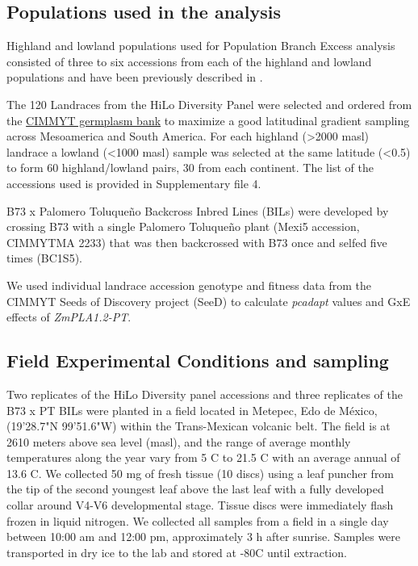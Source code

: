 \documentclass[9pt,twocolumn,twoside,lineno]{BioRxiv}
\begin{document}
\subsection{Populations used in the analysis } 
Highland and lowland populations used for Population Branch Excess analysis consisted of three to six accessions from each of the highland and lowland populations and have been previously described in \cite{Wang2020-mp, Wang2017-bc}. 

The 120 Landraces from the HiLo Diversity Panel were selected and ordered from the \href{http://mgb.cimmyt.org/gringlobal/search.aspx}{CIMMYT germplasm bank} to maximize a good latitudinal gradient sampling across Mesoamerica and South America. For each highland  (>2000 masl) landrace a lowland (<1000 masl) sample was selected at the same latitude (<0.5\degree) to form 60 highland/lowland pairs, 30 from each continent. 
The list of the accessions used is provided in Supplementary file 4.   

B73 x Palomero Toluqueño Backcross Inbred Lines (BILs) were developed by crossing B73 with a single Palomero Toluqueño plant (Mexi5 accession, CIMMYTMA 2233) that was then backcrossed with B73 once and selfed five times (BC1S5).  

We used  individual landrace accession genotype and fitness data from the CIMMYT Seeds of Discovery project (SeeD) \cite{Gates2019-xu} to calculate \textit{pcadapt} \cite{Luu2017-ws} values and GxE effects of \textit{ZmPLA1.2-PT}.

\subsection{Field Experimental Conditions and sampling} 
Two replicates of the HiLo Diversity panel accessions and three replicates of the B73 x PT BILs were planted in a field located in Metepec, Edo de México, (19'28.7"N 99'51.6"W) within the Trans-Mexican volcanic belt. 
The field is at 2610 meters above sea level (masl), and the range of average monthly temperatures along the year vary from 5 \degree C to 21.5 \degree C with an average annual of 13.6 \degree C.  
We collected 50 mg of fresh tissue (10 discs) using a leaf puncher from the tip of the second youngest leaf above the last leaf with a fully developed collar around V4-V6 developmental stage. 
Tissue discs were immediately flash frozen in liquid nitrogen. 
We collected all samples from a field in a single day between 10:00 am and 12:00 pm, approximately 3 h after sunrise. 
Samples were transported in dry ice to the lab and stored at -80\degree C until extraction. 
\end{document}
